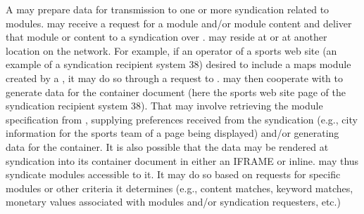 A \syndicationserver{} may prepare data for transmission to one or more syndication
\recipientservers{} related to modules. \Syndicationserver{} may receive a request for a module and/or module content and
deliver that module or content to a syndication \recipientserver{} over \network{}. \syndicationserver{} may
reside at \hostserversystem{} or at another location on the
network. For example, if an operator of a sports web site (an example
of a syndication recipient system 38) desired to include a maps
module created by a \remotesourcesystem, it may do so
through a request to \syndicationserver{}. \Syndicationserver{} may then cooperate with \moduleserver{} to generate
data for the container document (here the sports web site page of the
syndication recipient system 38). That may involve retrieving
the module specification from \remotesourcesystem,
supplying preferences received from the syndication \recipientserver{} (e.g., city information for the sports team of a page being
displayed) and/or generating data for the container. It is also
possible that the data may be rendered at syndication \recipientserver{} into its container document in either an IFRAME or
inline. \syndicationserver{} may thus syndicate modules
accessible to it. It may do so based on requests for specific modules
or other criteria it determines (e.g., content matches, keyword
matches, monetary values associated with modules and/or syndication
requesters, etc.)



